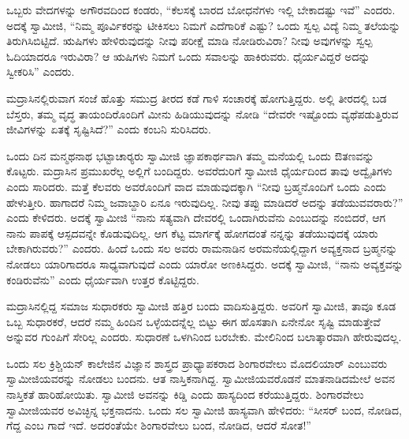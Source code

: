  ಒಬ್ಬರು ವೇದಗಳನ್ನು ಅಗೌರವದಿಂದ ಕಂಡರು, “ಕೆಲಸಕ್ಕೆ ಬಾರದ ಬೋಧನೆಗಳು ಇಲ್ಲಿ ಬೇಕಾದಷ್ಟು ಇವೆ” ಎಂದರು. ಅದಕ್ಕೆ ಸ್ವಾಮೀಜಿ, “ನಿಮ್ಮ ಪೂರ್ವಿಕರನ್ನು ಟೀಕಿಸಲು ನಿಮಗೆ ಎದೆಗಾರಿಕೆ ಎಷ್ಟು? ಒಂದು ಸ್ವಲ್ಪ ವಿದ್ಯೆ ನಿಮ್ಮ ತಲೆಯನ್ನು ತಿರುಗಿಸಿಬಿಟ್ಟಿದೆ. ಋಷಿಗಳು ಹೇಳಿರುವುದನ್ನು ನೀವು ಪರೀಕ್ಷೆ ಮಾಡಿ ನೋಡಿರುವಿರಾ? ನೀವು ಅವುಗಳನ್ನು ಸ್ವಲ್ಪ ಓದಿಯಾದರೂ ಇರುವಿರಾ? ಆ ಋಷಿಗಳು ನಿಮಗೆ ಒಂದು ಸವಾಲನ್ನು ಹಾಕಿರುವರು. ಧೈರ್ಯವಿದ್ದರೆ ಅದನ್ನು ಸ್ವೀಕರಿಸಿ” ಎಂದರು. 

 ಮದ್ರಾಸಿನಲ್ಲಿರುವಾಗ ಸಂಜೆ ಹೊತ್ತು ಸಮುದ್ರ ತೀರದ ಕಡೆ ಗಾಳಿ ಸಂಚಾರಕ್ಕೆ ಹೋಗುತ್ತಿದ್ದರು. ಅಲ್ಲಿ ತೀರದಲ್ಲಿ ಬಡ ಬೆಸ್ತರು, ತಮ್ಮ ವೃದ್ಧ ತಾಯಂದಿರೊಂದಿಗೆ ಮೀನು ಹಿಡಿಯುವುದನ್ನು ನೋಡಿ “ದೇವರೇ ಇಷ್ಟೊಂದು ವ್ಯಥೆಪಡುತ್ತಿರುವ ಜೀವಿಗಳನ್ನು ಏತಕ್ಕೆ ಸೃಷ್ಟಿಸಿದೆ?” ಎಂದು ಕಂಬನಿ ಸುರಿಸಿದರು. 

 ಒಂದು ದಿನ ಮನ್ಮಥನಾಥ ಭಟ್ಟಾಚಾರ‍್ಯರು ಸ್ವಾಮೀಜಿ ಜ್ಞಾಪಕಾರ್ಥವಾಗಿ ತಮ್ಮ ಮನೆಯಲ್ಲಿ ಒಂದು ಔತಣವನ್ನು ಕೊಟ್ಟರು. ಮದ್ರಾಸಿನ ಪ್ರಮುಖರೆಲ್ಲ ಅಲ್ಲಿಗೆ ಬಂದಿದ್ದರು. ಅವರೆದುರಿಗೆ ಸ್ವಾಮೀಜಿ ಧೈರ್ಯದಿಂದ ತಾವು ಅದ್ವೈತಿಗಳು ಎಂದು ಸಾರಿದರು. ಮತ್ತೆ ಕೆಲವರು ಅವರೊಂದಿಗೆ ವಾದ ಮಾಡುವುದಕ್ಕಾಗಿ “ನೀವು ಬ್ರಹ್ಮನೊಂದಿಗೆ ಒಂದು ಎಂದು ಹೇಳುತ್ತೀರಿ. ಹಾಗಾದರೆ ನಿಮ್ಮ ಜವಾಬ್ದಾರಿ ಏನೂ ಇರುವುದಿಲ್ಲ. ನೀವು ತಪ್ಪು ಮಾಡಿದರೆ ಅದನ್ನು ತಡೆಯುವವರಾರು?” ಎಂದು ಕೇಳಿದರು. ಅದಕ್ಕೆ ಸ್ವಾಮೀಜಿ “ನಾನು ಸತ್ಯವಾಗಿ ದೇವರಲ್ಲಿ ಒಂದಾಗಿರುವೆನು ಎಂಬುದನ್ನು ನಂಬಿದರೆ, ಆಗ ನಾನು ಪಾಪಕ್ಕೆ ಆಸ್ಪದವನ್ನೇ ಕೊಡುವುದಿಲ್ಲ. ಆಗ ಕೆಟ್ಟ ಮಾರ್ಗಕ್ಕೆ ಹೋಗದಂತೆ ನನ್ನನ್ನು ತಡೆಯುವುದಕ್ಕೆ ಯಾರು ಬೇಕಾಗಿರುವರು?” ಎಂದರು. ಹಿಂದೆ ಒಂದು ಸಲ ಅವರು ರಾಮನಾಡಿನ ಅರಮನೆಯಲ್ಲಿದ್ದಾಗ ಅವ್ಯಕ್ತನಾದ ಬ್ರಹ್ಮನನ್ನು ನೋಡಲು ಯಾರಿಗಾದರೂ ಸಾಧ್ಯವಾಗುವುದೆ ಎಂದು ಯಾರೋ ಅಣಕಿಸಿದ್ದರು. ಅದಕ್ಕೆ ಸ್ವಾಮೀಜಿ, “ನಾನು ಅವ್ಯಕ್ತವನ್ನು ಕಂಡಿರುವೆನು” ಎಂದು ಧೈರ್ಯವಾಗಿ ಉತ್ತರ ಕೊಟ್ಟಿದ್ದರು. 

 ಮದ್ರಾಸಿನಲ್ಲಿದ್ದ ಸಮಾಜ ಸುಧಾರಕರು ಸ್ವಾಮೀಜಿ ಹತ್ತಿರ ಬಂದು ವಾದಿಸುತ್ತಿದ್ದರು. ಅವರಿಗೆ ಸ್ವಾಮೀಜಿ, ತಾವೂ ಕೂಡ ಒಬ್ಬ ಸುಧಾರಕರೆ, ಆದರೆ ನಮ್ಮ ಹಿಂದಿನ ಒಳ್ಳೆಯದನ್ನೆಲ್ಲ ಬಿಟ್ಟು ಈಗ ಹೊಸತಾಗಿ ಏನೇನೋ ಸೃಷ್ಟಿ ಮಾಡುತ್ತೇವೆ ಅನ್ನುವರ ಗುಂಪಿಗೆ ಸೇರಿಲ್ಲ ಎಂದರು. ಸುಧಾರಣೆ ಒಳಗಿನಿಂದ ಬರಬೇಕು. ಮೇಲಿನಿಂದ ಬಲಾತ್ಕಾರವಾಗಿ ಹೇರುವುದಲ್ಲ. 

 ಒಂದು ಸಲ ಕ್ರಿಶ್ಚಿಯನ್ ಕಾಲೇಜಿನ ವಿಜ್ಞಾನ ಶಾಸ್ತ್ರದ ಪ್ರಾಧ್ಯಾಪಕರಾದ ಶಿಂಗಾರವೇಲು ಮೊದಲಿಯಾರ್ ಎಂಬುವರು ಸ್ವಾಮೀಜಿಯವರನ್ನು ನೋಡಲು ಬಂದನು. ಆತ ನಾಸ್ತಿಕನಾಗಿದ್ದ. ಸ್ವಾಮೀಜಿಯವರೊಡನೆ ಮಾತನಾಡಿದಮೇಲೆ ಅವನ ನಾಸ್ತಿಕತೆ ಹಾರಿಹೋಯಿತು. ಸ್ವಾಮೀಜಿ ಅವನನ್ನು ಕಿಡ್ಡಿ ಎಂದು ಹಾಸ್ಯದಿಂದ ಕರೆಯುತ್ತಿದ್ದರು. ಶಿಂಗಾರವೇಲು ಸ್ವಾಮೀಜಿಯವರ ಅವಿಚ್ಛಿನ್ನ ಭಕ್ತನಾದನು. ಒಂದು ಸಲ ಸ್ವಾಮೀಜಿ ಹಾಸ್ಯವಾಗಿ ಹೇಳಿದರು: “ಸೀಸರ್ ಬಂದ, ನೋಡಿದ, ಗೆದ್ದ ಎಂಬ ಗಾದೆ ಇದೆ. ಅದರಂತೆಯೇ ಶಿಂಗಾರವೇಲು ಬಂದ, ನೋಡಿದ, ಆದರೆ ಸೋತ!” 

